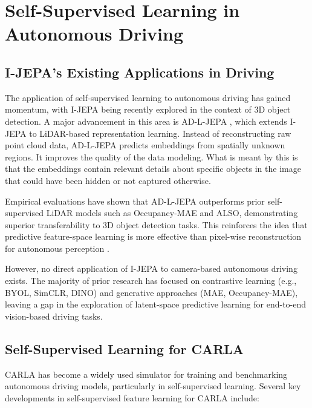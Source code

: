 \documentclass{article}
\begin{document}

\section{Self-Supervised Learning in Autonomous Driving}

\subsection{I-JEPA’s Existing Applications in Driving}

The application of self-supervised learning to autonomous driving has gained momentum, with I-JEPA being recently explored in the context of 3D object detection. A major advancement in this area is AD-L-JEPA \citep{zhu2025ad}, which extends I-JEPA to LiDAR-based representation learning. Instead of reconstructing raw point cloud data, AD-L-JEPA predicts embeddings from spatially unknown regions. It improves the quality of the data modeling. What is meant by this is that the embeddings contain relevant details about specific objects in the image that could have been hidden or not captured otherwise. 

Empirical evaluations have shown that AD-L-JEPA outperforms prior self-supervised LiDAR models such as Occupancy-MAE and ALSO, demonstrating superior transferability to 3D object detection tasks. This reinforces the idea that predictive feature-space learning is more effective than pixel-wise reconstruction for autonomous perception \citep{zhu2025ad}.

However, no direct application of I-JEPA to camera-based autonomous driving exists. The majority of prior research has focused on contrastive learning (e.g., BYOL, SimCLR, DINO) and generative approaches (MAE, Occupancy-MAE), leaving a gap in the exploration of latent-space predictive learning for end-to-end vision-based driving tasks.

\subsection{Self-Supervised Learning for CARLA}
CARLA has become a widely used simulator for training and benchmarking autonomous driving models, particularly in self-supervised learning. Several key developments in self-supervised feature learning for CARLA include:
\end{document}
